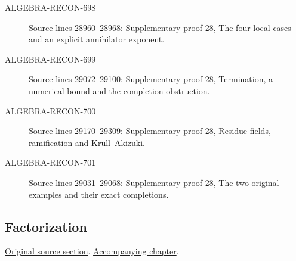\begin{description}
\item[ALGEBRA-RECON-698] Source lines 28960--28968: \hyperlink{algebra_krull_akizuki_notes_20260928}{Supplementary proof 28}, The four local cases and an explicit annihilator exponent.
\item[ALGEBRA-RECON-699] Source lines 29072--29100: \hyperlink{algebra_krull_akizuki_notes_20260928}{Supplementary proof 28}, Termination, a numerical bound and the completion obstruction.
\item[ALGEBRA-RECON-700] Source lines 29170--29309: \hyperlink{algebra_krull_akizuki_notes_20260928}{Supplementary proof 28}, Residue fields, ramification and Krull–Akizuki.
\item[ALGEBRA-RECON-701] Source lines 29031--29068: \hyperlink{algebra_krull_akizuki_notes_20260928}{Supplementary proof 28}, The two original examples and their exact completions.
\end{description}

\subsection{Factorization}
\hypertarget{algebra-source-section-factoring}{}
\noindent\href{https://github.com/stacks/stacks-project/blob/a04446e57ec1fbc252a871afcec7752fb2807b14/algebra.tex\#L29347}{Original source section}. \href{algebra.pdf\#nameddest=section-factoring}{Accompanying chapter}.

